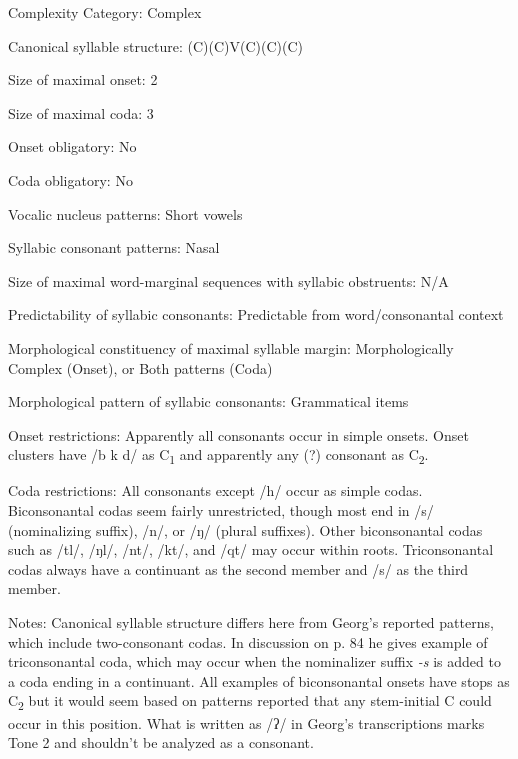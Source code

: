 {\begin{appendixdesc}
\item[Complexity Category:] Complex

\item[Canonical syllable structure:] (C)(C)V(C)(C)(C) \citep[80--84]{Georg2007}

\item[Size of maximal onset:] 2

\item[Size of maximal coda:] 3

\item[Onset obligatory:] No

\item[Coda obligatory:] No

\item[Vocalic nucleus patterns:] Short vowels

\item[Syllabic consonant patterns:] Nasal

\item[Size of maximal word-marginal sequences with syllabic obstruents:] N/A

\item[Predictability of syllabic consonants:] Predictable from word/consonantal context

\item[Morphological constituency of maximal syllable margin:] Morphologically Complex (Onset), or Both patterns (Coda)

\item[Morphological pattern of syllabic consonants:] Grammatical items

\item[Onset restrictions:] Apparently all consonants occur in simple onsets. Onset clusters have /b k d/ as C\textsubscript{1} and apparently any (?) consonant as C\textsubscript{2}.

\item[Coda restrictions:] All consonants except /h/ occur as simple codas. Biconsonantal codas seem fairly unrestricted, though most end in /s/ (nominalizing suffix), /n/, or /ŋ/ (plural suffixes). Other biconsonantal codas such as /tl/, /ŋl/, /nt/, /kt/, and /qt/ may occur within roots. Triconsonantal codas always have a continuant as the second member and /s/ as the third member.

\item[Notes:] Canonical syllable structure differs here from Georg’s reported patterns, which include two-consonant codas. In discussion on p. 84 he gives example of triconsonantal coda, which may occur when the nominalizer suffix \textit{{}-s} is added to a coda ending in a continuant. All examples of biconsonantal onsets have stops as C\textsubscript{2} but it would seem based on patterns reported that any stem-initial C could occur in this position. What is written as /ʔ/ in Georg’s transcriptions marks Tone 2 and shouldn’t be analyzed as a consonant.
\end{appendixdesc}
}
